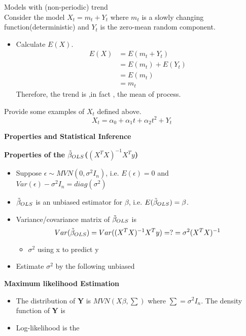 \documentclass[12pt]{article}
\begin{document}
\begin{example}
    Models with (non-periodic) trend\\
    Consider the model $X_t = m_t + Y_t$ where $m_t$ is a slowly changing function(deterministic) and $Y_t$ is the zero-mean random component.
    \begin{itemize} 
        \item Calculate $E(X)$.
        \begin{align*}
            E(X) &= E(m_t + Y_t)\\
            &= E(m_t) + E(Y_t)\\
            &= E(m_t) \\
            &= m_t
        \end{align*}
        Therefore, the trend is ,in fact , the mean of process.
    \end{itemize}
    \item Provide some examples of $X_t$ defined above.
    $$ X_t = \alpha_0 + \alpha_1 t + \alpha_2 t^2 + Y_t$$
\end{example}



\begin{definition}
    \textbf{Properties and Statistical Inference}
\end{definition}

\begin{definition}
    \textbf{Properties of the $\Tilde{\beta}_{OLS}$($(X^TX)^{-1} X^T  y $)}
    \begin{itemize}
        \item Suppose $\epsilon \sim MVN(0,\sigma^2I_n) $, i.e. $E(\epsilon) = 0$ and $Var(\epsilon) - \sigma^2 I_n = diag(\sigma^2)$
        \item $\Tilde{\beta}_{OLS}$ is an unbiased estimator for $\beta$, i.e. $E(\Tilde{\beta}_{OLS}) = \beta$.
        \item Variance/covariance matrix of $\Tilde{\beta}_{OLS}$ is $$Var(\Tilde{\beta}_{OLS}) = Var((X^TX)^{-1}X^Ty) = ? = \sigma^2(X^TX)^{-1}$$
        \begin{itemize}
            \item $\sigma^2$ using x to predict y 
        \end{itemize}
        \item Estimate $\sigma^2$ by the following unbiased
    \end{itemize}
\end{definition}
\begin{definition}
    \textbf{ Maximum likelihood Estimation}
    \begin{itemize}
        \item The distribution of \textbf{Y} is $MVN(X\beta,\sum)$ where $\sum = \sigma^2 I_n$. The density function of \textbf{Y} is 
        \item Log-likelihood is the 
    \end{itemize}
\end{definition}
\end{document}
